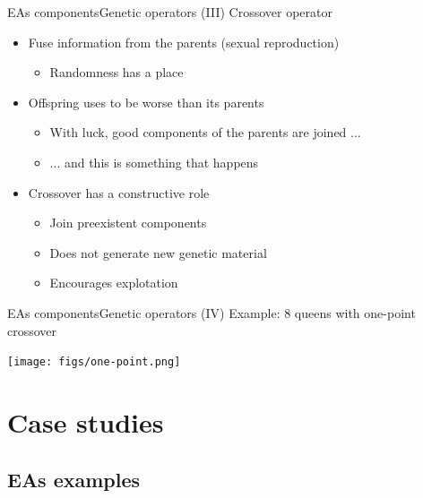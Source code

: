 \documentclass[10pt,compress]{beamer} %
\begin{document}
\begin{frame}{EAs components}{Genetic operators (III)} 
	Crossover operator
	\begin{itemize}
		\item Fuse information from the parents (sexual reproduction)
		\begin{itemize}
			\item Randomness has a place 
		\end{itemize}
		\item Offspring uses to be worse than its parents
		\begin{itemize}
			\item With luck, good components of the parents are joined ...
			\item ... and this is something that happens
		\end{itemize}
		\item Crossover has a constructive role
		\begin{itemize}
			\item Join preexistent components
			\item Does not generate new genetic material
			\item Encourages explotation
		\end{itemize}
	\end{itemize}
\end{frame}

\begin{frame}{EAs components}{Genetic operators (IV)} 
	Example: 8 queens with one-point crossover
	\begin{center}
		\texttt{[image: figs/one-point.png]}
	\end{center}
\end{frame}

\section{Case studies}

\subsection{EAs examples}
\end{document}
